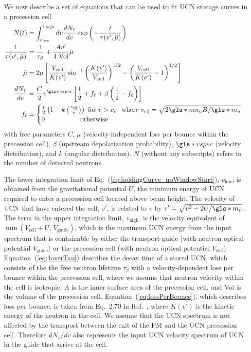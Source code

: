 We now describe a set of equations that can be used to fit UCN storage curves in a precession cell
%
\begin{align}
    N(t) &= \int_{v_\text{low}}^{v_\text{high}} dv \frac{dN_1}{dv}\exp{\left(-\frac{t}{\tau(v',\bar{\mu})}\right)}\label{eq:holdingCurve_noWindowStart} \\
    \frac{1}{\tau(v',\bar{\mu})} &=\frac{1}{\tau_\beta}+\frac{Av'}{4\text{ Vol}}\bar{\mu} \label{eq:1overTau}\\
     \bar{\mu} &= 2\mu \left[ \frac{V_\text{cell}}{K(v')} \sin^{-1}\left( \frac{K(v')}{V_\text{cell}}\right)^{1/2} -\left( \frac{V_\text{cell}}{K(v')} - 1 \right)^{1/2} \right]\label{eq:lossPerBounce}\\
    \frac{dN_1}{dv} &= \frac{C}{2} v^{\gls*{vspec}} \left[ \frac{1}{2} + f_\ell + \beta \left( \frac{1}{2} - f_\ell \right)  \right] \label{eq:dN1dv_no_window}\\
    f_\ell &=\begin{cases}
        \frac{1}{2} \left( 1 - k\left(\frac{v_{\text{c}\parallel}}{v}\right) \right) \text{ for } v>v_{\text{c}\parallel} \text{ where } v_{\text{c}\parallel} = \sqrt{2 \gls*{mu_n} B/ \gls*{m_n}} \\
        0 \hspace{53pt}\text{otherwise}
        \end{cases}\label{eq:holdingCurve_noWindowEnd}
\end{align}
%
with free parameters $C$, $\mu$ (velocity-independent loss per bounce within the precession cell), $\beta$ (upstream depolarization probability), $\gls*{vspec}$ (velocity distribution), and $k$ (angular distribution). $N$ (without any subscripts) refers to the number of detected neutrons. 

The lower integration limit of Eq.~(\ref{eq:holdingCurve_noWindowStart}), $v_\text{low}$, is obtained from the gravitational potential $U$, the minimum energy of UCN required to enter a precession cell located above beam height.  The velocity of UCN that have entered the cell, $v'$, is related to $v$ by $v' = \sqrt{v^2 - 2U/ \gls*{m_n}}$. The term in the upper integration limit, $v_\text{high}$, is the velocity equivalent of $\min( V_\text{cell} + U,\, V_\text{guide})$, which is the maximum UCN energy from the input spectrum that is containable by either the transport guide (with neutron optical potential $V_\text{guide}$) or the precession cell (with neutron optical potential $V_\text{cell}$). Equation~(\ref{eq:1overTau}) describes the decay time of a stored UCN, which consists of the the free neutron lifetime $\tau_\beta$ with a velocity-dependent loss per bounce within the precession cell, where we assume that neutron velocity within the cell is isotropic. $A$ is the inner surface area of the precession cell, and Vol is the volume of the precession cell. Equation~(\ref{eq:lossPerBounce}), which describes loss per bounce, is taken from Eq.~2.70 in Ref.~\cite{golubUCN}, where $K(v')$ is the kinetic energy of the neutron in the cell. We assume that the UCN spectrum is not affected by the transport between the exit of the PM and the UCN precession cell. Therefore $dN_1/dv$ also represents the input UCN velocity spectrum of UCN in the guide that arrive at the cell.


